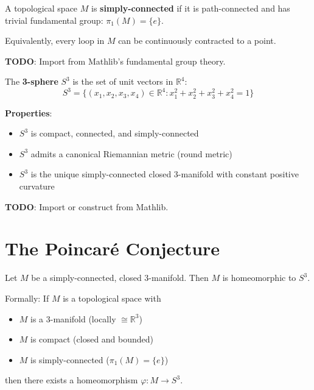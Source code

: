 \begin{definition}
\label{def:simply_connected}
A topological space $M$ is \textbf{simply-connected} if it is path-connected and has trivial fundamental group: $\pi_1(M) = \{e\}$.

Equivalently, every loop in $M$ can be continuously contracted to a point.

\textbf{TODO}: Import from Mathlib's fundamental group theory.
\end{definition}

\begin{definition}[3-Sphere]
\label{def:sphere3}
The \textbf{3-sphere} $S^3$ is the set of unit vectors in $\mathbb{R}^4$:
\[
S^3 = \{(x_1, x_2, x_3, x_4) \in \mathbb{R}^4 : x_1^2 + x_2^2 + x_3^2 + x_4^2 = 1\}
\]

\textbf{Properties}:
\begin{itemize}
\item $S^3$ is compact, connected, and simply-connected
\item $S^3$ admits a canonical Riemannian metric (round metric)
\item $S^3$ is the unique simply-connected closed 3-manifold with constant positive curvature
\end{itemize}

\textbf{TODO}: Import or construct from Mathlib.
\end{definition}

\section{The Poincaré Conjecture}

\begin{theorem}
\label{thm:poincare_conjecture}
Let $M$ be a simply-connected, closed 3-manifold. Then $M$ is homeomorphic to $S^3$.

Formally: If $M$ is a topological space with
\begin{itemize}
\item $M$ is a 3-manifold (locally $\cong \mathbb{R}^3$)
\item $M$ is compact (closed and bounded)
\item $M$ is simply-connected ($\pi_1(M) = \{e\}$)
\end{itemize}
then there exists a homeomorphism $\varphi : M \to S^3$.
\end{theorem}

